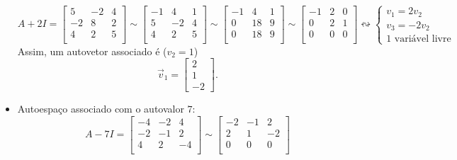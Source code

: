 \documentclass[../livro.tex]{subfiles}
\begin{document}
\begin{example}
\begin{itemize}
		\begin{equation}
		A + 2 I = 
		\begin{bmatrix}
		5 & -2 & 4 \\  
		-2 & 8 & 2 \\
		4 & 2 & 5 \\
		\end{bmatrix} \sim
		\begin{bmatrix}
		-1 & 4 & 1 \\
		5 & -2 & 4 \\  
		4 & 2 & 5 \\
		\end{bmatrix} \sim 
		\begin{bmatrix}
		-1 & 4 & 1 \\
		0 & 18 & 9 \\  
		0 & 18 & 9 \\
		\end{bmatrix} \sim
		\begin{bmatrix}
		-1 & 2 & 0 \\
		0 &  2 & 1 \\  
		0 &  0 & 0 \\
		\end{bmatrix} \leftrightsquigarrow
		\left\lbrace 
		\begin{array}{l}
		v_1 = 2 v_2 \\
		v_3 = - 2 v_2 \\
		\text{1 variável livre}
		\end{array}
		\right. 
		\end{equation} Assim, um autovetor associado é ($v_2 = 1$)
		\begin{equation}
		\vec{v}_1 = 
		\begin{bmatrix}
		2 \\ 1 \\ -2
		\end{bmatrix}.
		\end{equation}
		\item Autoespaço associado com o autovalor $7$:
		\begin{equation}
		A - 7 I = 
		\begin{bmatrix}
		-4 & -2 & 4 \\  
		-2 & -1 & 2 \\
		4 & 2 & -4 \\
		\end{bmatrix} \sim
		\begin{bmatrix}
		-2 & -1 & 2 \\
		2 & 1 & -2 \\  
		0 & 0 & 0 \\

\end{bmatrix}
\end{equation}
\end{itemize}
\end{example}
\end{document}

